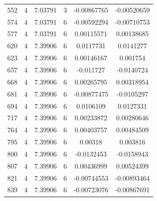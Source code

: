 \documentclass[11pt]{article}
\begin{document}
\begin{longtable} {c c c c c c}
552&	4&	7.03791&	3&	-0.00867765&	-0.00520659\\
574&	4&	7.03791&	6&	-0.00592294&	-0.00710753\\
577&	4&	7.03791&	6&	0.00115571&	0.00138685\\
620&	4&	7.39906&	6&	0.0117731&	0.0141277\\
623&	4&	7.39906&	6&	0.00146167&	0.001754\\
657&	4&	7.39906&	6&	-0.011727&	-0.0140724\\
668&	4&	7.39906&	6&	0.00265795&	0.00318954\\
681&	4&	7.39906&	6&	-0.00877475&	-0.0105297\\
694&	4&	7.39906&	6&	0.0106109&	0.0127331\\
717&	4&	7.39906&	6&	0.00233872&	0.00280646\\
764&	4&	7.39906&	6&	0.00403757&	0.00484509\\
795&	4&	7.39906&	6&	0.00318 &	0.003816\\
800&	4&	7.39906&	6&	-0.0132453&	-0.0158943\\
807&	4&	7.39906&	6&	0.00436999&	0.00524399\\
821&	4&	7.39906&	6&	-0.00744553&	-0.00893464\\
839&	4&	7.39906&	6&	-0.00723076&	-0.00867691\\
\end{longtable}
\end{document}
